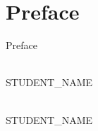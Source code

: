 \documentclass[../main.tex]{subfiles}
\begin{document}
\section*{Preface}
Preface

\noindent
\begin{minipage}{1\textwidth}
\begin{center}

\begin{minipage}{0.5\textwidth}
\begin{flushleft} \footnotesize
\begin{center}
\begin{figure}[H] 
 \centering
   \end{figure} 
\underline{\hspace{6cm}}\\
STUDENT_NAME\\
\end{center}
\end{flushleft}
\end{minipage}%
\begin{minipage}{0.5\textwidth}
\begin{flushright} \footnotesize
\begin{center}
\begin{figure}[H] 
 \centering
   \end{figure} 
\underline{\hspace{6cm}}\\
STUDENT_NAME\\
\end{center}
\end{flushright}
\end{minipage}\\

\end{center}
\end{minipage}
\end{document}
